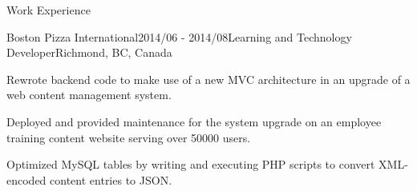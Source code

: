 \documentclass{resume} %
\begin{document}
\begin{rSection}{Work Experience}
\begin{rSubsection}{Boston Pizza International}{2014/06 - 2014/08}{Learning and Technology Developer}{Richmond, BC, Canada}
\item Rewrote backend code to make use of a new MVC architecture in an upgrade of a web content management system.
\item Deployed and provided maintenance for the system upgrade on an employee training content website serving over 50000 users.
\item Optimized MySQL tables by writing and executing PHP scripts to convert XML-encoded content entries to JSON.
\end{rSubsection}



\end{rSection}




\end{document}
